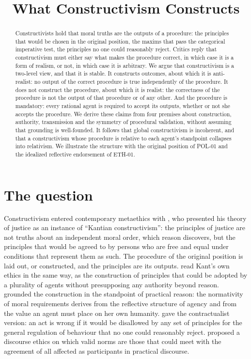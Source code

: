 \documentclass{situationist-preprint}
\title{What Constructivism Constructs}
\begin{document}
\maketitle

\begin{abstract}
Constructivists hold that moral truths are the outputs of a procedure: the principles that would be chosen in the original position, the maxims that pass the categorical imperative test, the principles no one could reasonably reject. Critics reply that constructivism must either say what makes the procedure correct, in which case it is a form of realism, or not, in which case it is arbitrary. We argue that constructivism is a two-level view, and that it is stable. It constructs outcomes, about which it is anti-realist: no output of the correct procedure is true independently of the procedure. It does not construct the procedure, about which it is realist: the correctness of the procedure is not the output of that procedure or of any other. And the procedure is mandatory: every rational agent is required to accept its outputs, whether or not she accepts the procedure. We derive these claims from four premises about construction, authority, transmission and the symmetry of procedural validation, without assuming that grounding is well-founded. It follows that global constructivism is incoherent, and that a constructivism whose procedure is relative to each agent's standpoint collapses into relativism. We illustrate the structure with the original position of POL-01 and the idealized reflective endorsement of ETH-01.
\end{abstract}

\section{The question}

Constructivism entered contemporary metaethics with \citet{Rawls1980}, who presented his theory of justice as an instance of \enquote{Kantian constructivism}: the principles of justice are not truths about an independent moral order, which reason discovers, but the principles that would be agreed to by persons who are free and equal under conditions that represent them as such. The procedure of the original position \citep{Rawls1971} is laid out, or constructed, and the principles are its outputs. \citet{ONeill1989} read Kant's own ethics in the same way, as the construction of principles that could be adopted by a plurality of agents without presupposing any authority beyond reason. \citet{Korsgaard1996} grounded the construction in the standpoint of practical reason: the normativity of moral requirements derives from the reflective structure of agency and from the value an agent must place on her own humanity. \citet{Scanlon1998} gave the contractualist version: an act is wrong if it would be disallowed by any set of principles for the general regulation of behaviour that no one could reasonably reject. \citet{Habermas1990} proposed a discourse ethics on which valid norms are those that could meet with the agreement of all affected as participants in practical discourse.
\end{document}
